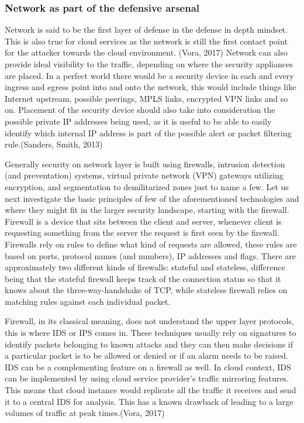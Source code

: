 \documentclass{article}
\begin{document}
\subsubsection{Network as part of the defensive arsenal}
Network is said to be the first layer of defense in the defense in depth mindset. This is also true for cloud services as the network is still the first contact point for the attacker towards the cloud environment. (Vora, 2017)
Network can also provide ideal visibility to the traffic, depending on where the security appliances are placed. In a perfect world there would be a security device in each and every ingress and egress point into and onto the network, this would include things like Internet upstream, possible peerings, MPLS links, encrypted VPN links and so on. Placement of the security device should also take into consideration the possible private IP addresses being used, as it is useful to be able to easily identify which internal IP address is part of the possible alert or packet filtering rule.(Sanders, Smith, 2013)
\par
Generally security on network layer is built using firewalls, intrusion detection (and preventation) systems, virtual private network (VPN) gateways utilizing encryption, and segmentation to demilitarized zones just to name a few. Let us next investigate the basic principles of few of the aforementioned technologies and where they might fit in the larger security landscape, starting with the firewall. Firewall is a device that sits between the client and server, whenever client is requesting something from the server the request is first seen by the firewall. Firewalls rely on rules to define what kind of requests are allowed, these rules are based on ports, protocol names (and numbers), IP addresses and flags. There are approximately two different kinds of firewalls: stateful and stateless, difference being that the stateful firewall keeps track of the connection status so that it knows about the three-way-handshake of TCP, while stateless firewall relies on matching rules against each individual packet.
\par
Firewall, in its classical meaning, does not understand the upper layer protocols, this is where IDS or IPS comes in. These techniques usually rely on signatures to identify packets belonging to known attacks and they can then make decisions if a particular packet is to be allowed or denied or if an alarm needs to be raised. IDS can be a complementing feature on a firewall as well. In cloud context, IDS can be implemented by using cloud service provider's traffic mirroring features. This means that cloud instance would replicate all the traffic it receives and send it to a central IDS for analysis. This has a known drawback of leading to a large volumes of traffic at peak times.(Vora, 2017)
\end{document}
